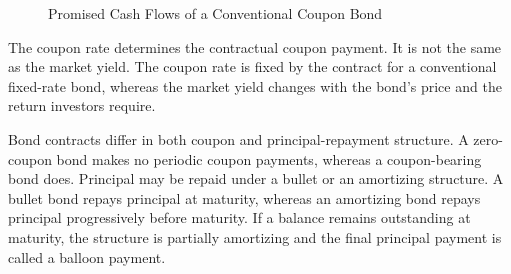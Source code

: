 \begin{figure}[H]
\centering
{}

\caption{Promised Cash Flows of a Conventional Coupon Bond}
\label{fig:ch8-coupon-bond-cashflows}
\end{figure}

The coupon rate determines the contractual coupon payment. It is not the same as the market yield. The coupon rate is fixed by the contract for a conventional fixed-rate bond, whereas the market yield changes with the bond's price and the return investors require.

Bond contracts differ in both coupon and principal-repayment structure. A zero-coupon bond makes no periodic coupon payments, whereas a coupon-bearing bond does. Principal may be repaid under a bullet or an amortizing structure. A bullet bond repays principal at maturity, whereas an amortizing bond repays principal progressively before maturity. If a balance remains outstanding at maturity, the structure is partially amortizing and the final principal payment is called a balloon payment.

